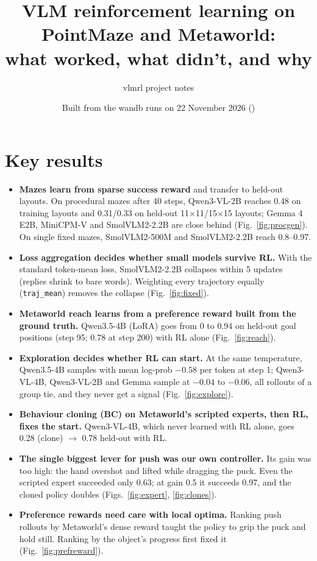 \documentclass[11pt]{article}
\title{VLM reinforcement learning on PointMaze and Metaworld:\\what worked, what didn't, and why}
\author{vlmrl project notes}
\date{Built from the wandb runs on 22 November 2026 (\code{scripts/make\_results\_pdf.py})}
\newcommand{\code}[1]{\texttt{#1}}
\begin{document}
\maketitle

\section*{Key results}
\begin{itemize}
\item \textbf{Mazes learn from sparse success reward} and transfer to held-out layouts. On procedural mazes after 40
  steps, Qwen3-VL-2B reaches 0.48 on training layouts and 0.31/0.33 on held-out 11$\times$11/15$\times$15 layouts; Gemma 4
  E2B, MiniCPM-V and SmolVLM2-2.2B are close behind (Fig.~\ref{fig:procgen}). On single fixed mazes, SmolVLM2-500M and
  SmolVLM2-2.2B reach 0.8--0.97.
\item \textbf{Loss aggregation decides whether small models survive RL.} With the standard token-mean loss,
  SmolVLM2-2.2B collapses within 5 updates (replies shrink to bare words). Weighting every trajectory equally
  (\code{traj\_mean}) removes the collapse (Fig.~\ref{fig:fixed}).
\item \textbf{Metaworld reach learns from a preference reward built from the ground truth.} Qwen3.5-4B (LoRA) goes from 0 to
  0.94 on held-out goal positions (step 95; 0.78 at step 200) with RL alone (Fig.~\ref{fig:reach}).
\item \textbf{Exploration decides whether RL can start.} At the same temperature, Qwen3.5-4B samples with mean log-prob
  $-0.58$ per token at step 1; Qwen3-VL-4B, Qwen3-VL-2B and Gemma sample at $-0.04$ to $-0.06$, all rollouts of a group
  tie, and they never get a signal (Fig.~\ref{fig:explore}).
\item \textbf{Behaviour cloning (BC) on Metaworld's scripted experts, then RL, fixes the start.} Qwen3-VL-4B, which never
  learned with RL alone, goes 0.28 (clone) $\to$ 0.78 held-out with RL.
\item \textbf{The single biggest lever for push was our own controller.} Its gain was too high: the hand overshot and
  lifted while dragging the puck. Even the scripted expert succeeded only 0.63; at gain 0.5 it succeeds 0.97, and the
  cloned policy doubles (Figs.~\ref{fig:expert}, \ref{fig:clones}).
\item \textbf{Preference rewards need care with local optima.} Ranking push rollouts by Metaworld's dense reward taught the
  policy to grip the puck and hold still. Ranking by the object's progress first fixed it (Fig.~\ref{fig:prefreward}).

\end{itemize}
\end{document}

